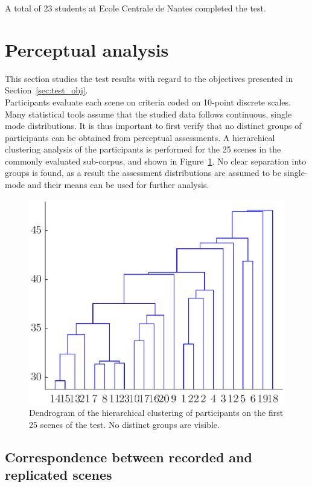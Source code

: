 \documentclass[11pt,a4paper]{article}
\begin{document}
A total of 23 students at Ecole Centrale de Nantes completed the test.

\section{Perceptual analysis}

This section studies the test results with regard to the objectives presented in Section~\ref{sec:test_obj}.\\

Participants evaluate each scene on criteria coded on 10-point discrete scales. Many statistical tools assume that the studied data follows continuous, single mode distributions. It is thus important to first verify that no distinct groups of participants can be obtained from perceptual assessments. A hierarchical clustering analysis of the participants is performed for the 25 scenes in the commonly evaluated sub-corpus, and shown in Figure~\ref{fig:hclusters}. No clear separation into groups is found, as a result the assessment distributions are assumed to be single-mode and their means can be used for further analysis.

\begin{figure}[!h]
    \centering
    \includegraphics[width=\textwidth]{figures/subj_gr.eps}
    \caption{Dendrogram of the hierarchical clustering of participants on the first 25 scenes of the test. No distinct groups are visible.}\label{fig:hclusters}
\end{figure}

\subsection{Correspondence between recorded and replicated scenes}
\end{document}
